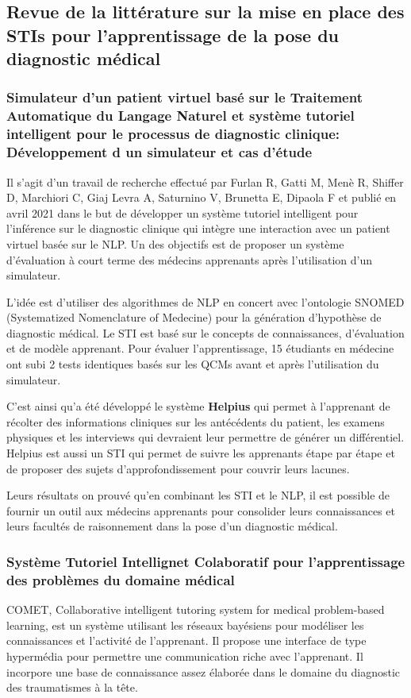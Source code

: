 \subsection{Revue de la littérature sur la mise en place des STIs pour l'apprentissage de la pose du diagnostic médical}

\subsubsection{Simulateur d'un patient virtuel basé sur le Traitement Automatique du Langage Naturel et système tutoriel intelligent pour le processus de diagnostic clinique: Développement d un simulateur et cas d'étude}
Il s'agit d'un travail de recherche effectué par Furlan R, Gatti M, Menè R, Shiffer D, Marchiori C, Giaj Levra A, Saturnino V, Brunetta E, Dipaola F et publié en avril 2021 dans le but de développer un système tutoriel intelligent pour l'inférence sur le  diagnostic clinique qui intègre une interaction avec un patient virtuel basée sur le NLP. Un des objectifs est de proposer un système d'évaluation à court terme des médecins apprenants après l'utilisation d'un simulateur.

L'idée est d'utiliser des algorithmes de NLP en concert avec l'ontologie SNOMED (Systematized Nomenclature of Medecine) pour la génération d'hypothèse de diagnostic médical. Le STI est basé sur le concepts de connaissances, d'évaluation et de modèle apprenant. Pour évaluer l'apprentissage, 15 étudiants en médecine ont subi 2 tests identiques  basés sur les QCMs avant et après l'utilisation du simulateur.

C'est ainsi qu'a été développé le système \textbf{Helpius} qui permet à l'apprenant de récolter des informations cliniques sur les antécédents du patient, les examens physiques et les interviews qui devraient leur permettre de générer un différentiel. Helpius est aussi un STI qui permet de suivre les apprenants étape par étape et de proposer des sujets d'approfondissement pour couvrir leurs lacunes.

Leurs résultats on prouvé qu'en combinant les STI et le NLP, il est possible de fournir un outil aux médecins apprenants pour consolider leurs connaissances et leurs facultés de raisonnement dans la pose d'un diagnostic médical.

\subsubsection{Système Tutoriel Intellignet Colaboratif pour l'apprentissage des problèmes du domaine médical}
COMET, Collaborative intelligent tutoring system for medical problem-based learning, est un système utilisant les réseaux bayésiens pour modéliser les connaissances et l'activité de l'apprenant. Il propose une interface de type hypermédia pour permettre une communication riche avec l'apprenant. Il incorpore une base de connaissance assez élaborée dans le domaine du diagnostic des traumatismes à la tête.

